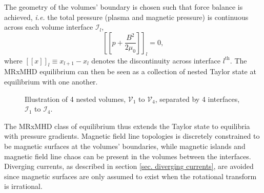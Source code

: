 \documentclass[my_thesis.tex]{subfiles}
\begin{document}
The geometry of the volumes' boundary is chosen such that force balance is achieved, \textit{i.e.} the total pressure (plasma and magnetic pressure) is continuous across each volume interface $\mathcal{I}_l$,
\begin{equation}
	\left[\left[p + \frac{B^2}{2\mu_0}\right]\right]_l = 0, \label{eq.force_balance}
\end{equation}
where $[[x]]_l\equiv x_{l+1}-x_l$ denotes the discontinuity across interface $l^{\text{th}}$. The MRxMHD equilibrium can then be seen as a collection of nested Taylor state at equilibrium with one another. 

\begin{figure}
	\centering
	\caption{Illustration of 4 nested volumes, $\mathcal{V}_1$ to $\mathcal{V}_4$, separated by 4 interfaces, $\mathcal{I}_1$ to $\mathcal{I}_4$.}
	\label{fig:Illustration_SPEC}
\end{figure}

The MRxMHD class of equilibrium thus extends the Taylor state to equilibria with pressure gradients. Magnetic field line topologies is discretely constrained to be magnetic surfaces at the volumes' boundaries, while magnetic islands and magnetic field line chaos can be present in the volumes between the interfaces. Diverging currents, as described in section \ref{sec. diverging currents}, are avoided since magnetic surfaces are only assumed to exist when the rotational transform is irrational. 
\end{document}
